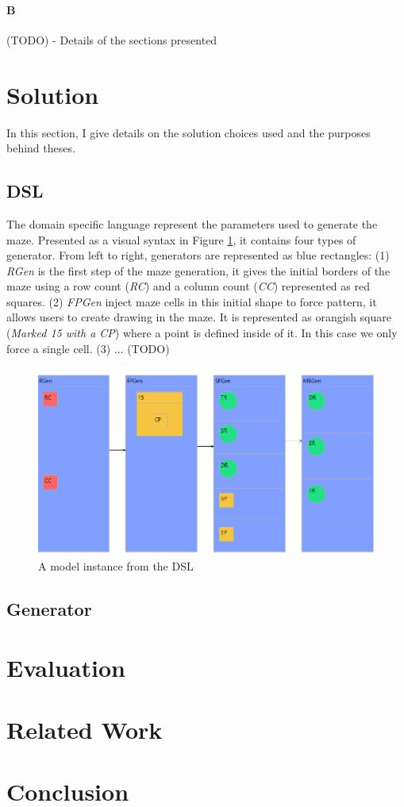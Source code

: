 \documentclass[review]{elsarticle}
\begin{document}
\paragraph{B}
(TODO) - Details of the sections presented

\section{Solution}

In this section, I give details on the solution choices used and the purposes behind theses.

\subsection{DSL}

The domain specific language represent the parameters used to generate the maze. Presented as a visual syntax in Figure \ref{fig:model}, it contains four types of generator. From left to right, generators are represented as blue rectangles: (1) \textit{RGen} is the first step of the maze generation, it gives the initial borders of the maze using a row count (\textit{RC}) and a column count (\textit{CC}) represented as red squares. (2) \textit{FPGen} inject maze cells in this initial shape to force pattern, it allows users to create drawing in the maze. It is represented as orangish square (\textit{Marked 15 with a CP}) where a point is defined inside of it. In this case we only force a single cell. (3) ... (TODO)

\begin{figure}
	\includegraphics[width=\linewidth]{model.png}
	\caption{A model instance from the DSL}
	\label{fig:model}
\end{figure}

\subsection{Generator}

\section{Evaluation}

\section{Related Work}

\section{Conclusion}


\end{document}
